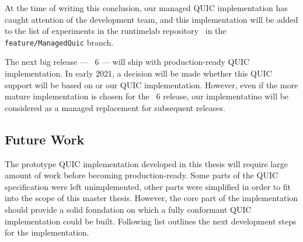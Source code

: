 At the time of writing this conclusion, our managed QUIC implementation has caught attention of the
\dotnet{} development team, and this implementation will be added to the list of experiments in the
runtimelab repository~\cite{runtimelabGithub} in the \texttt{feature/ManagedQuic} branch.

The next big release --- \dotnet{}~6 --- will ship with production-ready QUIC implementation. In early
2021, a decision will be made whether this QUIC support will be based on \libmsquic{} or our QUIC
implementation. However, even if the more mature \libmsquic{} implementation is chosen for the
\dotnet{}~6 release, our implementatino will be considered as a managed replacement for subsequent
\dotnet{} releases.

\subsection*{Future Work}

The prototype QUIC implementation developed in this thesis will require large amount of work before
becoming production-ready. Some parts of the QUIC specification were left unimplemented, other parts
were simplified in order to fit into the scope of this master thesis. However, the core part of the
implementation should provide a solid foundation on which a fully conformant QUIC implementation
could be built. Following list outlines the next development steps for the implementation.

